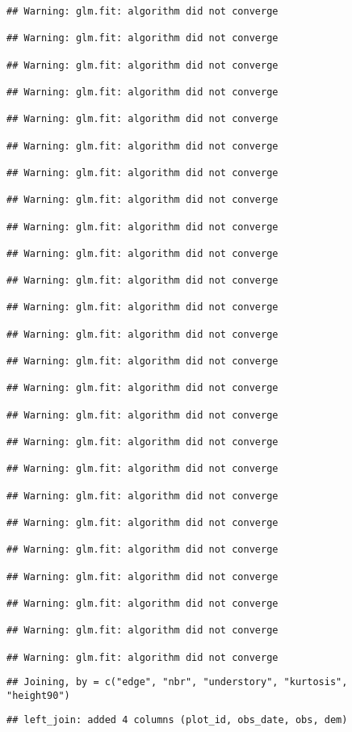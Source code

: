 \documentclass[
]{article}
\begin{document}
\begin{verbatim}
## Warning: glm.fit: algorithm did not converge

## Warning: glm.fit: algorithm did not converge

## Warning: glm.fit: algorithm did not converge

## Warning: glm.fit: algorithm did not converge

## Warning: glm.fit: algorithm did not converge

## Warning: glm.fit: algorithm did not converge

## Warning: glm.fit: algorithm did not converge

## Warning: glm.fit: algorithm did not converge

## Warning: glm.fit: algorithm did not converge

## Warning: glm.fit: algorithm did not converge

## Warning: glm.fit: algorithm did not converge

## Warning: glm.fit: algorithm did not converge

## Warning: glm.fit: algorithm did not converge

## Warning: glm.fit: algorithm did not converge

## Warning: glm.fit: algorithm did not converge

## Warning: glm.fit: algorithm did not converge

## Warning: glm.fit: algorithm did not converge

## Warning: glm.fit: algorithm did not converge

## Warning: glm.fit: algorithm did not converge

## Warning: glm.fit: algorithm did not converge

## Warning: glm.fit: algorithm did not converge

## Warning: glm.fit: algorithm did not converge

## Warning: glm.fit: algorithm did not converge

## Warning: glm.fit: algorithm did not converge

## Warning: glm.fit: algorithm did not converge
\end{verbatim}

\begin{verbatim}
## Joining, by = c("edge", "nbr", "understory", "kurtosis", "height90")
\end{verbatim}

\begin{verbatim}
## left_join: added 4 columns (plot_id, obs_date, obs, dem)
\end{verbatim}
\end{document}
